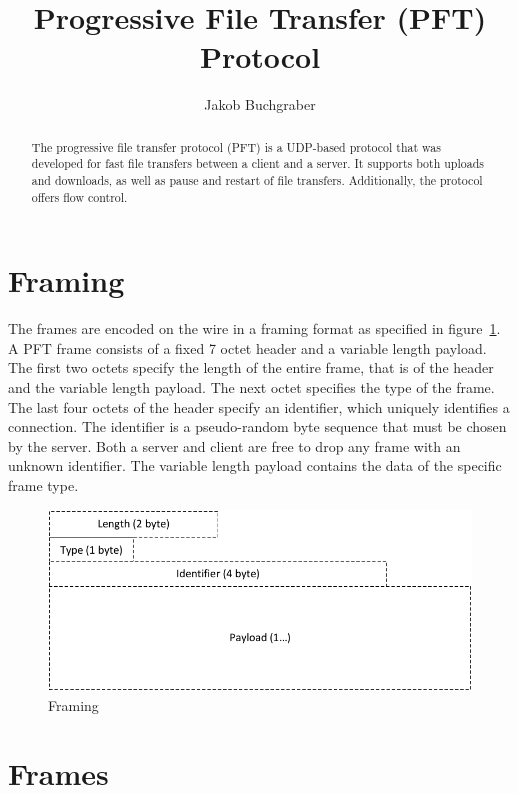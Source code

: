 \documentclass[]{article}
\begin{document}
\title{Progressive File Transfer (PFT) Protocol}
\author{
	Jakob Buchgraber
	}

\maketitle
\tableofcontents
\newpage

\begin{abstract}
The progressive file transfer protocol (PFT) is a UDP-based protocol
that was developed for fast file transfers between a client and a
server. It supports both uploads and downloads, as well as pause
and restart of file transfers. Additionally, the protocol offers
flow control.
\end{abstract}


\section{Framing}

The frames are encoded on the wire in a framing format as specified in figure~\ref{framing}.
A PFT frame consists of a fixed 7 octet header and a variable length payload. The first
two octets specify the length of the entire frame, that is of the header and the variable
length payload. The next octet specifies the type of the frame. The last four octets of
the header specify an identifier, which uniquely identifies a connection. The identifier
is a pseudo-random byte sequence that must be chosen by the server. Both a server and
client are free to drop any frame with an unknown identifier. The variable length payload
contains the data of the specific frame type.

\begin{figure}[H]
\centering
\includegraphics[width=\textwidth]{frames/framing.pdf}
\caption{Framing}
\label{framing}
\end{figure}

\section{Frames}
\end{document}

